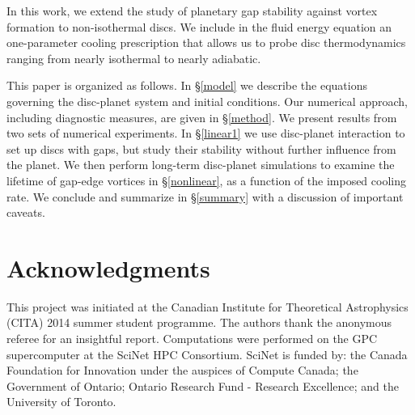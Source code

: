 \documentclass[useAMS,usenatbib]{mn2e}
\begin{document}
In this work, we extend the study of planetary gap stability against
vortex formation to non-isothermal discs. We include in the fluid energy
equation an one-parameter cooling prescription that allows us to probe
disc thermodynamics ranging from nearly isothermal to nearly
adiabatic.      

This paper is organized as follows. In \S\ref{model} we describe the
equations governing the disc-planet system and initial conditions. Our
numerical approach, including diagnostic measures, are given in
\S\ref{method}. We present results from two sets of numerical
experiments. In \S\ref{linear1} we use disc-planet interaction to set
up discs with gaps, but study their stability without further
influence from the planet. 
We then perform long-term disc-planet simulations to examine the
lifetime of gap-edge vortices in \S\ref{nonlinear},  
as a function of the imposed cooling rate. We conclude and summarize
in \S\ref{summary} with a discussion of important caveats. 





%


\section*{Acknowledgments}
This project was initiated at the Canadian Institute for Theoretical
Astrophysics (CITA) 2014 summer student programme. The authors
  thank the anonymous referee for an insightful report. 
Computations were performed on the GPC supercomputer at the
SciNet HPC Consortium. SciNet is funded by: the Canada Foundation for
Innovation under the auspices of Compute Canada; the Government of
Ontario; Ontario Research Fund - Research Excellence; and the
University of Toronto.   




\appendix
%
%
\end{document}
